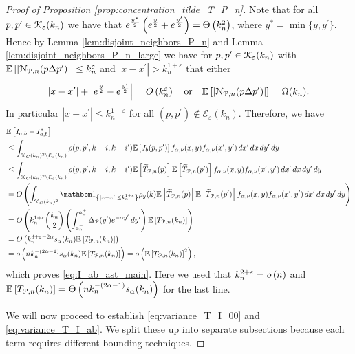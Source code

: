 \begin{proof}[Proof of Proposition \ref{prop:concentration_tilde_T_P_n}]
Note that for all $p,p^\prime \in {\mathcal K}_{\varepsilon}(k_n)$ we have that $e^{\frac{y^\ast}{2}}\left(e^{\frac{y}{2}} + e^{\frac{y^\prime}{2}}\right) = \Theta\left(k_n^2\right)$, where $y^\ast = \min\{y,y^\prime\}$. Hence by Lemma \ref{lem:disjoint_neighbors_P_n} and Lemma \ref{lem:disjoint_neighbors_P_n_large} we have for $p,p^\prime \in {\mathcal K}_{\varepsilon}(k_n)$ with $\mathbb{E}\left[\left|{\mathcal N}_{{\mathcal P},n}(p\Delta p^\prime)\right|\right] \le k_n^{\varepsilon}$ and $|x-x^\prime| > k_n^{1+\varepsilon}$ that either
\[
	|x - x^\prime| + \left|e^{\frac{y}{2}} - e^{\frac{y^\prime}{2}}\right| = O\left(k_n^\varepsilon\right)
	\quad \text{or} \quad
	\mathbb{E}\left[\left|{\mathcal N}_{{\mathcal P},n}(p\Delta p^\prime)\right|\right] = \Omega(k_n).
\]
In particular $|x - x^\prime| \le k_n^{1+\varepsilon}$ for all $(p, p^\prime) \notin \mathcal{E}_{\varepsilon}(k_n)$. Therefore, we have
\begin{align*}
	&\Exp{I_{a,b} - I_{a,b}^\ast}\\
	&\le \int_{\Kcal_C(k_n)^2 \setminus \mathcal{E}_\varepsilon(k_n)} \rho(p, p^\prime, k - i, k - i^\prime) 
		\Exp{J_b(p,p^\prime)} f_{\alpha,\nu}(x,y) f_{\alpha,\nu}(x^\prime,y^\prime) \, dx^\prime \, dx \, dy^\prime \, dy\\
	&\le \int_{\Kcal_C(k_n)^2 \setminus \mathcal{E}_\varepsilon(k_n)} \rho(p, p^\prime, k - i, k - i^\prime) 
		\Exp{\widetilde{T}_{\Pcal,n}(p)}\Exp{\widetilde{T}_{\Pcal,n}(p^\prime)} f_{\alpha,\nu}(x,y) f_{\alpha,\nu}(x^\prime,y^\prime) \, dx^\prime \, dx \, dy^\prime \, dy\\
	&= \bigO{\int_{\Kcal_C(k_n)^2} \ind{|x-x^\prime| \le k_n^{1 + \varepsilon}} \rho_{y}(k) 
		\Exp{\widetilde{T}_{\Pcal,n}(p)}\Exp{\widetilde{T}_{\Pcal,n}(p^\prime)} f_{\alpha,\nu}(x,y) f_{\alpha,\nu}(x^\prime,y^\prime) \, dx^\prime \, dx \, dy^\prime \, dy}\\
	&= \bigO{k_n^{1+\varepsilon} \binom{k_n}{2} \left(\int_{a_n^-}^{a_n^+} \Delta_{\Pcal}(y^\prime) 
			e^{-\alpha y^\prime} \, dy^\prime\right) \Exp{T_{\Pcal,n}(k_n)}}\\
	&= \bigO{k_n^{3 + \varepsilon -2\alpha} s_\alpha(k_n) \Exp{T_{\Pcal,n}(k_n)}}\\
	&= \smallO{n k_n^{-(2\alpha - 1)}s_\alpha(k_n) \Exp{T_{\Pcal,n}(k_n)}} = \smallO{\Exp{T_{\Pcal,n}(k_n)}^2},
\end{align*}
which proves \eqref{eq:I_ab_ast_main}. Here we used that $k_n^{2 + \varepsilon} = o\left(n\right)$ and $\mathbb{E}\left[T_{{\mathcal P},n}(k_n)\right] = \Theta\left(n k_n^{-(2\alpha - 1)}s_\alpha(k_n)\right)$ for the last line.


We will now proceed to establish \eqref{eq:variance_T_I_00} and \eqref{eq:variance_T_I_ab}. We split these up into separate subsections because each term requires different bounding techniques.


\end{proof}

